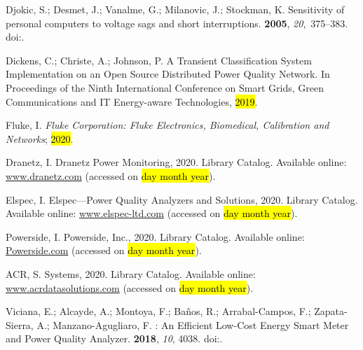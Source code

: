 \documentclass[energies,article,accept,moreauthors,pdftex]{Definitions/mdpi}
\begin{document}
\begin{thebibliography}{999}
Djokic, S.; Desmet, J.; Vanalme, G.; Milanovic, J.; Stockman, K.
\newblock Sensitivity of personal computers to voltage sags and short
interruptions.
 {\bf 2005}, {\em
20},~375--383.
\newblock 
doi:{\href{https://doi.org/10.1109/TPWRD.2004.837828}{}}.

Dickens, C.; Christe, A.; Johnson, P.
\newblock A {Transient} {Classification} {System} {Implementation} on an {Open}
{Source} {Distributed} {Power} {Quality} {Network}.
\newblock  In Proceedings of the {Ninth} {International} {Conference} on {Smart}
{Grids}, {Green} {Communications} and {IT} {Energy}-aware {Technologies},
\hl{2019}.

Fluke, I.
\newblock \emph{Fluke {Corporation}: {Fluke} {Electronics}, {Biomedical},
{Calibration} and {Networks}}; \hl{2020}.

Dranetz, I.
\newblock Dranetz {Power} {Monitoring}, 2020.
\newblock Library Catalog. Available online:  \url{ www.dranetz.com} (accessed on \hl{day month year}).

Elspec, I.
\newblock Elspec---{Power} Quality Analyzers and Solutions, 2020.
\newblock Library Catalog. Available online:  \url{www.elspec-ltd.com} (accessed on \hl{day month year}).

Powerside, I.
\newblock Powerside, {Inc}., 2020.
\newblock Library Catalog. Available online:  \url{Powerside.com}  (accessed on \hl{day month year}).

ACR, S.
 {Systems}, 2020.
\newblock Library Catalog. Available online:  \url{www.acrdatasolutions.com}  (accessed on \hl{day month year}).

Viciana, E.; Alcayde, A.; Montoya, F.; Baños, R.; Arrabal-Campos, F.;
Zapata-Sierra, A.; Manzano-Agugliaro, F.
: {An} {Efficient} {Low}-{Cost} {Energy} {Smart} {Meter}
and {Power} {Quality} {Analyzer}.
 {\bf 2018}, {\em 10}, 4038.
\newblock 
doi:{\href{https://doi.org/10.3390/su10114038}{}}.


\end{thebibliography}
\end{document}
